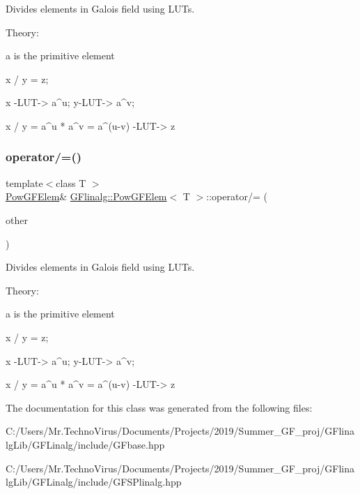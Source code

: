 Divides elements in Galois field using L\+U\+Ts. 

Theory\+: \begin{DoxyVerb}a is the primitive element

x / y = z;

x -LUT-> a^u; y-LUT-> a^v;

x / y = a^u * a^v = a^(u-v) -LUT-> z
\end{DoxyVerb}
 \mbox{\label{class_g_flinalg_1_1_pow_g_f_elem_a515c0c03a9aeb77786ad760f9e0672ae}} 
\subsubsection{\texorpdfstring{operator/=()}{operator/=()}}
{\footnotesize\ttfamily template$<$class T $>$ \\
\mbox{\hyperlink{class_g_flinalg_1_1_pow_g_f_elem}{Pow\+G\+F\+Elem}}\& \mbox{\hyperlink{class_g_flinalg_1_1_pow_g_f_elem}{G\+Flinalg\+::\+Pow\+G\+F\+Elem}}$<$ T $>$\+::operator/= (\begin{DoxyParamCaption}\item[{const \mbox{\hyperlink{class_g_flinalg_1_1_pow_g_f_elem}{Pow\+G\+F\+Elem}}$<$ T $>$ \&}]{other }\end{DoxyParamCaption})\hspace{0.3cm}{\ttfamily [inline]}}



Divides elements in Galois field using L\+U\+Ts. 

Theory\+: \begin{DoxyVerb}a is the primitive element

x / y = z;

x -LUT-> a^u; y-LUT-> a^v;

x / y = a^u * a^v = a^(u-v) -LUT-> z
\end{DoxyVerb}
 

The documentation for this class was generated from the following files\+:\begin{DoxyCompactItemize}
\item 
C\+:/\+Users/\+Mr.\+Techno\+Virus/\+Documents/\+Projects/2019/\+Summer\+\_\+\+G\+F\+\_\+proj/\+G\+Flinalg\+Lib/\+G\+F\+Linalg/include/G\+Fbase.\+hpp\item 
C\+:/\+Users/\+Mr.\+Techno\+Virus/\+Documents/\+Projects/2019/\+Summer\+\_\+\+G\+F\+\_\+proj/\+G\+Flinalg\+Lib/\+G\+F\+Linalg/include/G\+F\+S\+Plinalg.\+hpp\end{DoxyCompactItemize}
